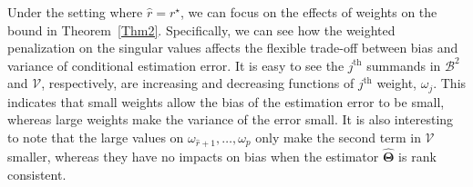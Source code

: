 \documentclass[12pt]{article}
\begin{document}
Under the setting where $\widehat{r}=r^{\star}$, we can focus on the effects of weights on the bound in Theorem~\ref{Thm2}.
Specifically, we can see how the weighted penalization on the singular values affects the flexible trade-off between bias and variance of conditional estimation error.
It is easy to see the $j^{\text{th}}$ summands in $\mathcal{B}^{2}$ and $\mathcal{V}$, respectively, are increasing and decreasing functions of $j^{\text{th}}$ weight, $\omega_{j}$.
This indicates that small weights allow the bias of the estimation error to be small, whereas large weights make the variance of the error small.  
It is also interesting to note that the large values on $\omega_{\widehat{r}+1},\dots,\omega_{p}$ only make the second term in $\mathcal{V}$ smaller, whereas they have no impacts on bias when the estimator $\widehat{\boldsymbol{\Theta}}$ is rank consistent. 
\end{document}
